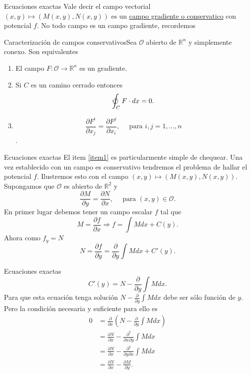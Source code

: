 \documentclass[handout,hyperref={colorlinks=true}]{beamer}
\newcommand{\rr}{\mathbb{R}}
\newcommand{\der}[2]{\frac{\partial #1}{\partial #2}}
\newcommand{\nl}{\onslide<+-> }
\begin{document}
\begin{frame}{Ecuaciones exactas}\label{camposconservativos}
\nl Vale decir el campo vectorial $(x,y)\mapsto (M(x,y),N(x,y))$ es un \href{http://es.wikipedia.org/wiki/Fuerza_conservativa}{campo 
gradiente o conservatico} con potencial $f$. No todo campo es un campo gradiente, recordemos

\nl \begin{block}{Caracterización de campos conservativos}Sea $\mathcal{O}$ abierto de $\rr^n$ y simplemente conexo. Son equivalentes
 \begin{enumerate}
  \item El campo $F:\mathcal{O}\to\rr^n$ es un gradiente.
  \item Si $C$ es un camino cerrado entonces
  \[\varointctrclockwise_C F\cdot d x=0.\]
  \item\label{item1} \[\frac{\partial F^i}{\partial x_j}=\frac{\partial F^j}{\partial x_i},\quad\text{ para }i,j=1,\ldots,n\]. 
 \end{enumerate}

\end{block}

\end{frame}

\begin{frame}{Ecuaciones exactas}
El item \ref{item1}  es particularmente simple de chequear. Una vez establecido con un campo es conservativo tendremos el problema de hallar el potencial $f$. 
Ilustremos esto con el campo $(x,y)\mapsto (M(x,y),N(x,y))$. Supongamos que $\mathcal{O}$ es abierto de $\rr^2$ y
\[\frac{\partial M}{\partial y}=\frac{\partial N}{\partial x},\quad\text{ para } (x,y)\in \mathcal{O}.\] 
En primer lugar debemos tener un campo escalar $f$ tal que
\[M=\frac{\partial f}{\partial x}\Rightarrow f=\int Mdx +C(y).\]
Ahora como $f_y=N$
\[N=\frac{\partial f}{\partial y}=\frac{\partial}{\partial y}\int Mdx +C'(y).\]

\end{frame}

\begin{frame}{Ecuaciones exactas}
\[C'(y)=N-\frac{\partial}{\partial y}\int Mdx .\]
\nl Para que esta ecuación tenga solución $N-\frac{\partial}{\partial y}\int Mdx$ debe ser sólo función de $y$. Pero la condición necesaria y suficiente para ello es 
\[\begin{split}0&=\frac{\partial}{\partial x}\left(N-\frac{\partial}{\partial y}\int Mdx\right)\\
&= \der{N}{x}-\frac{\partial^2}{\partial x\partial y}\int Mdx\\
&=\der{N}{x}-\frac{\partial^2}{\partial y\partial x}\int Mdx\\
&=\der{N}{x}-\der{M}{y}.
   \end{split}
\]
\end{frame}
\end{document}
